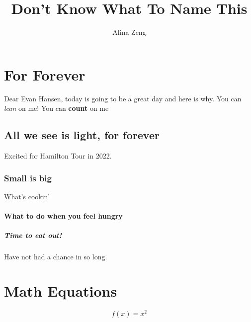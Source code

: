 \documentclass[a4paper, 12pt]{article}
\author{Alina Zeng}
\title{Don't Know What To Name This}
\begin{document}
\maketitle
\newpage
{}   %


\tableofcontents
\newpage  %

\section{For Forever}
Dear Evan Hansen, today is going to be a great day and here is why. \newline
You can \textsl{lean} on me!
You can \textbf{count} on me~ \newline


\subsection{All we see is light, for forever}
Excited for Hamilton Tour in 2022. \newline

\subsubsection {{\small Small} is {\Large big}}
What's cookin'

\paragraph {What to do when you feel hungry}

\subparagraph {Time to eat out!} Have not had a chance in so long.

\section{Math Equations}
\begin{equation*}
  f(x) = x^2
\end{equation*}
\end{document}

